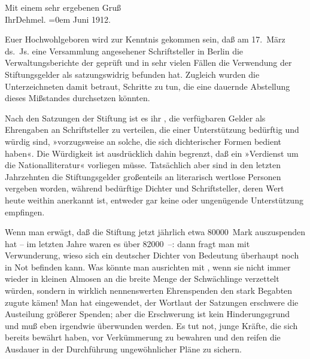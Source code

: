 \pstart
           Mit einem sehr ergebenen Gruß{\\[\baselineskip]}Ihr\spacefill\mbox{Dehmel.}\pend
           \leftskip=0em{}\vspace{1em}{\vspace{1\baselineskip}}
\pstart
           \raggedleft{}{\pb}Juni 1912.\pend
           
\pstart{}Euer Hochwohlgeboren\pend\vspace{0.5em}
\pstart
           wird zur Kenntnis gekommen sein, daß am 17. März ds. Js. eine
               Versammlung angesehener Schriftsteller in Berlin
               die Verwaltungsberichte der  geprüft und in sehr vielen Fällen die Verwendung der Stiftungsgelder als
               satzungswidrig befunden hat. Zugleich wurden die Unterzeichneten damit betraut,
               Schritte zu tun, die eine dauernde Abstellung dieses Mißstandes durchsetzen
               könnten.\pend
           
\pstart
           Nach den Satzungen der Stiftung ist es ihr , die
               verfügbaren Gelder als Ehrengaben an Schriftsteller zu verteilen, die einer
               Unterstützung bedürftig und würdig sind, »vorzugsweise an solche, die sich
               dichterischer Formen bedient haben«. Die Würdigkeit ist ausdrücklich dahin begrenzt,
               daß ein »Verdienst um die Nationalliteratur« vorliegen müsse. Tatsächlich aber sind
               in den letzten Jahrzehnten die Stiftungsgelder großenteils an literarisch wertlose
               Personen vergeben worden, während bedürftige Dichter und Schriftsteller, deren Wert
               heute weithin anerkannt ist, entweder gar keine oder ungenügende Unterstützung
               empfingen.\pend
           
\pstart
           Wenn man erwägt, daß die Stiftung jetzt jährlich etwa 80000 Mark auszuspenden hat –
               im letzten Jahre waren es über 82000 –: dann fragt man mit Verwunderung, wieso sich
               ein deutscher Dichter von Bedeutung überhaupt noch in Not befinden kann. Was könnte
               man ausrichten mit , wenn sie nicht
               immer wieder in kleinen Almosen an die breite Menge der Schwächlinge verzettelt
               würden, sondern in wirklich nennenswerten Ehrenspenden den stark Begabten zugute
               kämen! Man hat eingewendet, der Wortlaut der Satzungen erschwere die Austeilung
               größerer Spenden; aber die Erschwerung ist kein Hinderungsgrund und muß eben
               irgendwie überwunden werden. Es tut not, junge Kräfte, die sich bereits bewährt
               haben, vor Verkümmerung zu bewahren und den reifen die Ausdauer in der Durchführung
               ungewöhnlicher Pläne zu sichern.\pend
           
